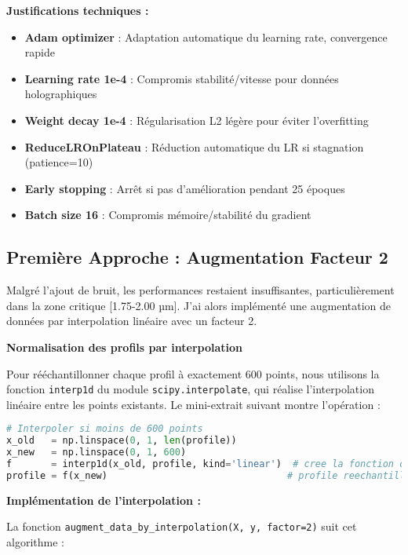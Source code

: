 \documentclass[11pt,a4paper,twocolumn]{article}
\begin{document}
\textbf{Justifications techniques :}
\begin{itemize}
    \item \textbf{Adam optimizer} : Adaptation automatique du learning rate, convergence rapide
    \item \textbf{Learning rate 1e-4} : Compromis stabilité/vitesse pour données holographiques
    \item \textbf{Weight decay 1e-4} : Régularisation L2 légère pour éviter l'overfitting
    \item \textbf{ReduceLROnPlateau} : Réduction automatique du LR si stagnation (patience=10)
    \item \textbf{Early stopping} : Arrêt si pas d'amélioration pendant 25 époques
    \item \textbf{Batch size 16} : Compromis mémoire/stabilité du gradient
\end{itemize}

\subsection{Première Approche : Augmentation Facteur 2}

Malgré l'ajout de bruit, les performances restaient insuffisantes, particulièrement dans la zone critique [1.75-2.00 µm]. J'ai alors implémenté une augmentation de données par interpolation linéaire avec un facteur 2.

\textbf{Normalisation des profils par interpolation}

Pour rééchantillonner chaque profil à exactement 600 points, nous utilisons la fonction \texttt{interp1d} du module \texttt{scipy.interpolate}, qui réalise l’interpolation linéaire entre les points existants. Le mini-extrait suivant montre l’opération :

\begin{lstlisting}[language=Python]
# Interpoler si moins de 600 points
x_old   = np.linspace(0, 1, len(profile))
x_new   = np.linspace(0, 1, 600)
f       = interp1d(x_old, profile, kind='linear')  # cree la fonction d’interpolation
profile = f(x_new)                                # profile reechantillonne 600 points
\end{lstlisting}
\textbf{Implémentation de l'interpolation :}

La fonction \texttt{augment\_data\_by\_interpolation(X, y, factor=2)} suit cet algorithme :
\end{document}
